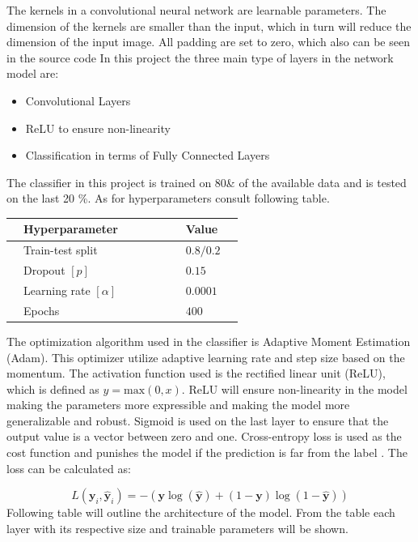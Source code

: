 \documentclass[12pt, fleqn, titlepage]{article}
\begin{document}
	The kernels in a convolutional neural network are learnable parameters. The dimension of the kernels are smaller than the input, which in turn will reduce the dimension of the input image. All padding are set to zero, which also can be seen in the source code %
	In this project the three main type of layers in the network model are:

	\begin{itemize}
	\item Convolutional Layers 
	\item ReLU to ensure non-linearity 
	\item Classification in terms of Fully Connected Layers
	\end{itemize}
	
	The classifier in this project is trained on 80\& of the available data and is tested on the last 20 \%. As for hyperparameters consult following table.
	
	\begin{table}[H]\label{hyperparams}
		\centering
		\begin{tabular}{l l l l l l l l l}
			\toprule
			& \textbf{Hyperparameter}           &&&&& & \textbf{Value}    & \\ \midrule
			& Train-test split         &&&&& & $0.8/0.2$& \\
			& Dropout $[p]$            &&&&& & $0.15$    & \\ 
			& Learning rate $[\alpha]$ &&&&& & $0.0001$  & \\ 
			& Epochs                   &&&&& & $400$    & \\  \bottomrule
		\end{tabular}
	\end{table}
	
	
	 The optimization algorithm used in the classifier is Adaptive Moment Estimation (Adam). This optimizer utilize adaptive learning rate and step size based on the momentum. The activation function used is the rectified linear unit (ReLU), which is defined as $ y = \text{max}(0,x) $. ReLU will ensure non-linearity in the model making the parameters more expressible and making the model more generalizable and robust. Sigmoid is used on the last layer to ensure that the output value is a vector between zero and one. Cross-entropy loss is used as the cost function and punishes the model if the prediction is far from the label \cite {dl}. The loss can be calculated as:
	 
	\begin{equation*}\label{key}
		L\left(\boldsymbol{y}_{i}, \hat{\boldsymbol{y}}_{i}\right) = -(\mathbf y \log (\mathbf {\hat y})+(1-\mathbf  y) \log (1-\mathbf {\hat y}))
	\end{equation*}
	\noindent
	Following table will outline the architecture of the model. From the table each layer with its respective size and trainable parameters will be shown.
	
\end{document}

